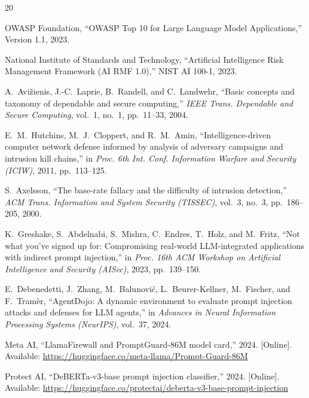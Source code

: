 \documentclass[conference]{IEEEtran}
\begin{document}
\begin{thebibliography}{20}

OWASP Foundation, ``OWASP Top 10 for Large Language Model Applications,'' Version 1.1, 2023.

National Institute of Standards and Technology, ``Artificial Intelligence Risk Management Framework (AI RMF 1.0),'' NIST AI 100-1, 2023.

A.~Avi\v{z}ienis, J.-C.~Laprie, B.~Randell, and C.~Landwehr, ``Basic concepts and taxonomy of dependable and secure computing,'' \textit{IEEE Trans. Dependable and Secure Computing}, vol.~1, no.~1, pp.~11--33, 2004.

E.~M.~Hutchins, M.~J.~Cloppert, and R.~M.~Amin, ``Intelligence-driven computer network defense informed by analysis of adversary campaigns and intrusion kill chains,'' in \textit{Proc. 6th Int. Conf. Information Warfare and Security (ICIW)}, 2011, pp.~113--125.

S.~Axelsson, ``The base-rate fallacy and the difficulty of intrusion detection,'' \textit{ACM Trans. Information and System Security (TISSEC)}, vol.~3, no.~3, pp.~186--205, 2000.

K.~Greshake, S.~Abdelnabi, S.~Mishra, C.~Endres, T.~Holz, and M.~Fritz, ``Not what you've signed up for: Compromising real-world LLM-integrated applications with indirect prompt injection,'' in \textit{Proc. 16th ACM Workshop on Artificial Intelligence and Security (AISec)}, 2023, pp.~139--150.

E.~Debenedetti, J.~Zhang, M.~Balunovi{\'c}, L.~Beurer-Kellner, M.~Fischer, and F.~Tram{\`e}r, ``AgentDojo: A dynamic environment to evaluate prompt injection attacks and defenses for LLM agents,'' in \textit{Advances in Neural Information Processing Systems (NeurIPS)}, vol.~37, 2024.

Meta AI, ``LlamaFirewall and PromptGuard-86M model card,'' 2024. [Online]. Available: \url{https://huggingface.co/meta-llama/Prompt-Guard-86M}

Protect AI, ``DeBERTa-v3-base prompt injection classifier,'' 2024. [Online]. Available: \url{https://huggingface.co/protectai/deberta-v3-base-prompt-injection}


\end{thebibliography}
\end{document}
